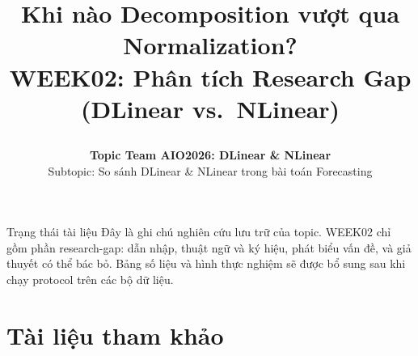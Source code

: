 \documentclass[12pt]{article}
\title{%
  \parbox[c][\TitleBlockHeight][c]{0.90\textwidth}{%
    \centering
    {\fontsize{18pt}{22pt}\selectfont\bfseries
      Khi nào Decomposition vượt qua Normalization?}\\[0.35em]
    {\fontsize{13pt}{16pt}\selectfont
      WEEK02: Phân tích Research Gap (DLinear vs.\ NLinear)}
  }%
}
\author{%
  \textbf{Topic Team AIO2026: DLinear \& NLinear}\\[0.4em]
  {\small Subtopic: So sánh DLinear \& NLinear trong bài toán Forecasting}
}
\date{}
\begin{document}
\maketitle
\thispagestyle{firstpage}
\vspace{-2em}

\begin{infobox}{Trạng thái tài liệu}
  Đây là ghi chú nghiên cứu lưu trữ của topic.
  WEEK02 chỉ gồm phần research-gap: dẫn nhập, thuật ngữ và ký hiệu, phát biểu vấn đề,
  và giả thuyết có thể bác bỏ. Bảng số liệu và hình thực nghiệm sẽ được bổ sung sau khi
  chạy protocol trên các bộ dữ liệu.
\end{infobox}






\section*{Tài liệu tham khảo}
\printbibliography[heading=none]


\end{document}

